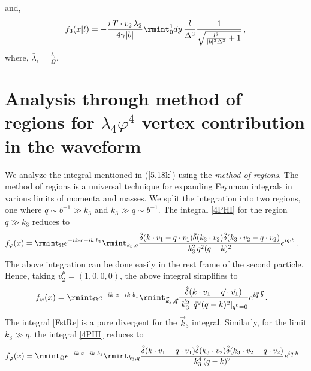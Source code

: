 and,
\begin{align}
    \begin{split}
        f_3(x|l)= -\frac{i \, T\cdot v_2\, \bar\lambda_2}{4\gamma |b|} \rmint_0^1 dy\, \frac{l}{ \bar\Delta^3}\frac{1}{\sqrt{\frac{l^2}{|b|^2 \Delta ^2}+1}}\,,
    \end{split}
\end{align}
where, $\bar\lambda_i=\frac{\lambda_i}{\Omega}$.
\section{\texorpdfstring{Analysis through method of regions for $\lambda_4\varphi^4$ vertex contribution in the waveform}{Analysis through method of regions for lambda4 phi4 vertex contribution in the waveform}}\label{ch2:app:D}
We analyze the integral mentioned in (\ref{5.18k}) using the \textit{method of regions}. The method of regions \cite{Beneke:1997zp} is a universal technique for expanding Feynman integrals in various limits of momenta and masses.
We split the integration into two regions, one where $q\sim b^{-1}\gg k_{3}$ and $k_{3}\gg q\sim b^{-1}$. The integral \eqref{4PHI} for the region $q\gg k_{3}$ reduces to 
\begin{align}
    \begin{split}
    \label{FstRe1}f_{\varphi}(x)&=\rmint_{\Omega}e^{-i k\cdot x+i k\cdot b_{1}}\rmint_{k_3,q} \frac{\hat\delta(k\cdot v_1-q\cdot v_1)\hat\delta(k_3\cdot v_2)\hat\delta(k_3\cdot v_2-q\cdot v_2)}{k_3^2 \, q^2(q-k)^2}e^{i q\cdot b}\,.
    \end{split}
\end{align}
The above integration can be done easily in the rest frame of the second particle. Hence, taking $v^{\mu}_{2}=(1,0,0,0)$, the above integral simplifies to 
\begin{align}
    \begin{split}
  \label{FstRe}   f_{\varphi}(x)&=\rmint_{\Omega}e^{-i k\cdot x+i k\cdot b_{1}}\rmint_{\vec{k}_3,\vec{q}} \frac{\hat\delta(k\cdot v_1-\vec{q}\cdot \vec{v}_1)}{|\vec{k}_3^2 |\, \vec{q}^2(q-k)^2|_{q^{0}=0}}e^{i \vec{q}\cdot \vec{b}}\,.
    \end{split}
\end{align}
The integral \eqref{FstRe} is a pure divergent for the $\vec{k}_3$ integral. Similarly, for the limit $k_3\gg q$, the integral \eqref{4PHI} reduces to 
\begin{align}
    \begin{split}
    \label{2NdRe}f_{\varphi}(x)&=\rmint_{\Omega}e^{-i k\cdot x+i k\cdot b_{1}}\rmint_{k_3,q} \frac{\hat\delta(k\cdot v_1-q\cdot v_1)\hat\delta(k_3\cdot v_2)\hat\delta(k_3\cdot v_2-q\cdot v_2)}{k_3^4 \,(q-k)^2}e^{i q\cdot b}
    \end{split}
\end{align}
